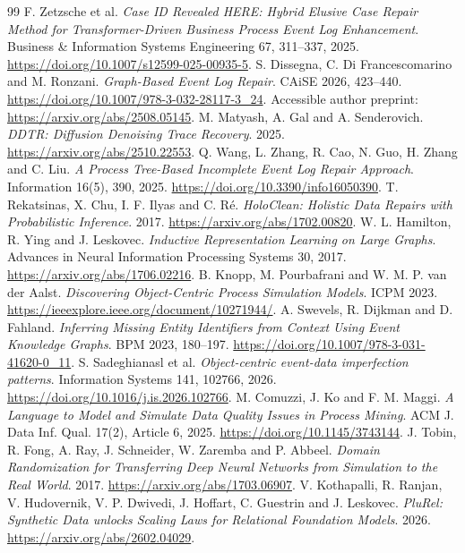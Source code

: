 \begin{thebibliography}{99}
 F. Zetzsche et al. \emph{Case ID Revealed HERE: Hybrid Elusive Case Repair Method for Transformer-Driven Business Process Event Log Enhancement}. Business \& Information Systems Engineering 67, 311--337, 2025. \url{https://doi.org/10.1007/s12599-025-00935-5}.
 S. Dissegna, C. Di Francescomarino and M. Ronzani. \emph{Graph-Based Event Log Repair}. CAiSE 2026, 423--440. \url{https://doi.org/10.1007/978-3-032-28117-3_24}. Accessible author preprint: \url{https://arxiv.org/abs/2508.05145}.
 M. Matyash, A. Gal and A. Senderovich. \emph{DDTR: Diffusion Denoising Trace Recovery}. 2025. \url{https://arxiv.org/abs/2510.22553}.
 Q. Wang, L. Zhang, R. Cao, N. Guo, H. Zhang and C. Liu. \emph{A Process Tree-Based Incomplete Event Log Repair Approach}. Information 16(5), 390, 2025. \url{https://doi.org/10.3390/info16050390}.
 T. Rekatsinas, X. Chu, I. F. Ilyas and C. R\'e. \emph{HoloClean: Holistic Data Repairs with Probabilistic Inference}. 2017. \url{https://arxiv.org/abs/1702.00820}.
 W. L. Hamilton, R. Ying and J. Leskovec. \emph{Inductive Representation Learning on Large Graphs}. Advances in Neural Information Processing Systems 30, 2017. \url{https://arxiv.org/abs/1706.02216}.
 B. Knopp, M. Pourbafrani and W. M. P. van der Aalst. \emph{Discovering Object-Centric Process Simulation Models}. ICPM 2023. \url{https://ieeexplore.ieee.org/document/10271944/}.
 A. Swevels, R. Dijkman and D. Fahland. \emph{Inferring Missing Entity Identifiers from Context Using Event Knowledge Graphs}. BPM 2023, 180--197. \url{https://doi.org/10.1007/978-3-031-41620-0_11}.
 S. Sadeghianasl et al. \emph{Object-centric event-data imperfection patterns}. Information Systems 141, 102766, 2026. \url{https://doi.org/10.1016/j.is.2026.102766}.
 M. Comuzzi, J. Ko and F. M. Maggi. \emph{A Language to Model and Simulate Data Quality Issues in Process Mining}. ACM J. Data Inf. Qual. 17(2), Article 6, 2025. \url{https://doi.org/10.1145/3743144}.
 J. Tobin, R. Fong, A. Ray, J. Schneider, W. Zaremba and P. Abbeel. \emph{Domain Randomization for Transferring Deep Neural Networks from Simulation to the Real World}. 2017. \url{https://arxiv.org/abs/1703.06907}.
 V. Kothapalli, R. Ranjan, V. Hudovernik, V. P. Dwivedi, J. Hoffart, C. Guestrin and J. Leskovec. \emph{PluRel: Synthetic Data unlocks Scaling Laws for Relational Foundation Models}. 2026. \url{https://arxiv.org/abs/2602.04029}.

\end{thebibliography}
